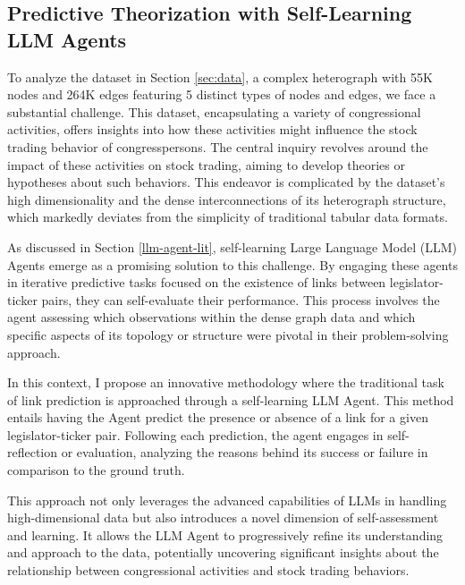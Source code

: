 \documentclass[15pt,letterpaper]{article}
\begin{document}
\subsection{Predictive Theorization with Self-Learning LLM Agents}

To analyze the dataset in Section \ref{sec:data}, 
a complex heterograph with 55K nodes and 264K edges featuring 5 distinct types of nodes and edges, 
we face a substantial challenge. This dataset, encapsulating a variety of congressional activities, 
offers insights into how these activities might influence the stock trading behavior of congresspersons. 
The central inquiry revolves around the impact of these activities on stock trading, aiming to develop theories or hypotheses about such behaviors. This endeavor is complicated by the dataset's high dimensionality and the dense interconnections of its heterograph structure, which markedly deviates from the simplicity of traditional tabular data formats.

As discussed in Section \ref{llm-agent-lit}, self-learning Large Language Model (LLM) Agents emerge as a promising solution to this challenge. By engaging these agents in iterative predictive tasks focused on the existence of links between legislator-ticker pairs, they can self-evaluate their performance. This process involves the agent assessing which observations within the dense graph data and which specific aspects of its topology or structure were pivotal in their problem-solving approach.

In this context, I propose an innovative methodology where the traditional task of link prediction is approached through a self-learning LLM Agent. This method entails having the Agent predict the presence or absence of a link for a given legislator-ticker pair. Following each prediction, the agent engages in self-reflection or evaluation, analyzing the reasons behind its success or failure in comparison to the ground truth.

This approach not only leverages the advanced capabilities of LLMs in handling high-dimensional data but also introduces a novel dimension of self-assessment and learning. It allows the LLM Agent to progressively refine its understanding and approach to the data, potentially uncovering significant insights about the relationship between congressional activities and stock trading behaviors. 
\end{document}
